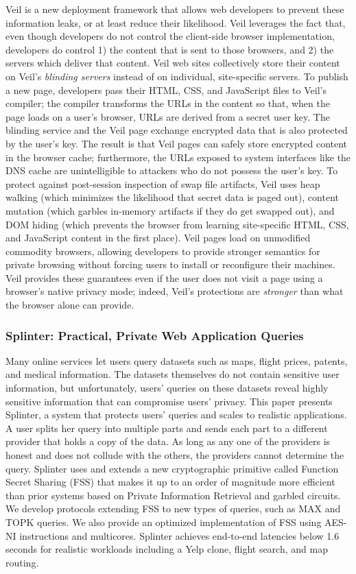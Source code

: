 Veil is a new deployment framework that allows
web developers to prevent these information leaks,
or at least reduce their likelihood. Veil leverages
the fact that, even though developers do not control the
client-side browser implementation, developers do
control 1) the content that is sent to those browsers,
and 2) the servers which deliver that content.
Veil web sites collectively store their content
on Veil's \emph{blinding servers} instead
of on individual, site-specific servers. To publish
a new page, developers pass their HTML, CSS, and
JavaScript files to Veil's compiler; the compiler
transforms the URLs in the content so that, when
the page loads on a user's browser, URLs are derived
from a secret user key. The blinding service and
the Veil page exchange encrypted
data that is also protected by the user's key. The
result is that Veil pages can safely store encrypted
content in the browser cache; furthermore, the URLs exposed
to system interfaces like the DNS cache are
unintelligible to attackers who do not possess
the user's key. To protect against post-session
inspection of swap file artifacts, Veil uses
heap walking (which minimizes the likelihood that
secret data is paged out), content mutation (which
garbles in-memory artifacts if they do get swapped out),
and DOM hiding (which prevents the browser from
learning site-specific HTML, CSS, and JavaScript
content in the first place). Veil pages load on unmodified
commodity browsers, allowing developers to provide
stronger semantics for private browsing without forcing
users to install or reconfigure their machines. Veil
provides these guarantees even if the user does not
visit a page using a browser's native privacy mode;
indeed, Veil's protections are \emph{stronger}
than what the browser alone can provide.

\subsubsection{Splinter: Practical, Private Web Application Queries}

Many online services let users query datasets such as maps, flight prices, patents,
and medical information. The datasets themselves do not contain sensitive user information,
but unfortunately, users' queries on these datasets reveal highly
sensitive information that can compromise users' privacy. 
This paper presents Splinter, a system that protects users' queries and
scales to realistic applications.
A user splits her query into multiple parts and sends each part 
to a different provider that holds a copy of the data.
As long as any one of the providers is honest and does not collude with the
others, the providers cannot determine the query.
Splinter uses and extends a new cryptographic primitive called Function Secret Sharing (FSS) that makes it up to an order of magnitude more efficient than prior systems based on Private Information Retrieval and garbled circuits.
We develop protocols extending FSS to new types of queries, such as MAX and TOPK queries. 
We also provide an optimized implementation of FSS using AES-NI instructions and multicores.
Splinter achieves end-to-end latencies below 1.6 seconds for realistic workloads including a Yelp clone, flight search, and map routing.

